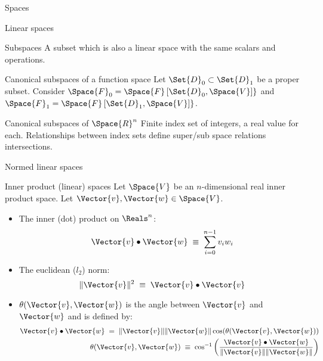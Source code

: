 \begin{plSection}{Spaces}
\begin{plSection}{Linear spaces}
\begin{plSection}{Subspaces}
A subset which is also a linear space with the
same scalars and operations.


\begin{plExample}{Canonical subspaces of a function space}{}
\bigskip
Let $\Set{D}_0 \subset \Set{D}_1$ be a proper subset.
Consider 
$\Space{F}_0 = \Space{F} \left[ \Set{D}_0, \Space{V} \right] \}$
and
$\Space{F}_1 = \Space{F} \left[ \Set{D}_1, \Space{V} \right] \}$.
\end{plExample}

\begin{plExample}{Canonical subspaces of $\Space{R}^n$}{}
\bigskip
Finite index set of integers, a real value for each.
Relationships between index sets define super/sub space relations
intersections.
\end{plExample}
\end{plSection}%
\begin{plSection}{Normed linear spaces}
\end{plSection}%
\begin{plSection}{Inner product (linear) spaces}
Let $\Space{V}$ be an $n$-dimensional real inner product space.
Let $\Vector{v}, \Vector{w} \in \Space{V}$.

\begin{itemize}
\item The inner (dot) product on $\Reals^n$:
\begin{equation}
\Vector{v} \bullet \Vector{w} \; \equiv \; \sum_{i=0}^{n-1} v_i w_i
\end{equation}

\item The euclidean ($l_2$) norm:
\begin{equation}
\| \Vector{v} \|^2 \; \equiv \; \Vector{v} \bullet \Vector{v}
\end{equation}

\item $\theta(\Vector{v},\Vector{w})$ is the angle between $\Vector{v}$ and $\Vector{w}$
and is defined by:
\begin{eqnarray}
\Vector{v} \bullet \Vector{w} \; = \; \| \Vector{v} \| \| \Vector{w} \| \cos(\theta(\Vector{v},\Vector{w}))
\\
\theta(\Vector{v},\Vector{w})
\; \equiv \;
\cos^{-1} \left(\frac{ \Vector{v} \bullet \Vector{w} }{\| \Vector{v} \| \| \Vector{w} \| } \right)
\nonumber
\end{eqnarray}


\end{itemize}
\end{plSection}
\end{plSection}
\end{plSection}
